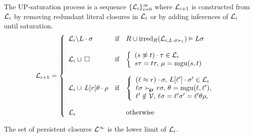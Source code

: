     \begin{definition}[UP-Saturation]

            The UP-{saturation process}
            is a sequence \( \{ \mathcal{L}_i \}_{i=0}^\infty \)
            where $\mathcal{L}_{i+1}$ is constructed from $\mathcal{L}_i$
            by removing redundant literal closures in $\mathcal{L}_i$
            or by adding inferences of $\mathcal{L}_i$ until saturation.
            \begin{gather*}
            \mathcal{L}_{i+1} = \left\{
                    \begin{array}{lclc}
                        \mathcal{L}_i \backslash L\cdot\sigma
                        &\text{if}
                        &R \cup \operatorname{irred}_R(\mathcal{L}_{i,L\cdot\sigma\mathrel\succ_{\mathtt{L}}}) \vDash L\sigma
                        \\
                        \\
                        \mathcal{L}_i \cup\,\square
                        &\text{if}
                        &\left\{\begin{array}{l}
                            (s\not\approx t)\cdot\tau\in\mathcal{L}_i
                            \\
                            s\tau = t\tau,\,
                            \mu=\operatorname{mgu}(s,t)
                        \end{array}\right.
                        \\
                        \\
                        \mathcal{L}_i \cup\, L[r]\theta\cdot\rho
                        &\text{if}
                        &\left\{\begin{array}{l}
                            (\ell\approx r)\cdot\sigma,\,
                            L[\ell']\cdot\sigma'\in\mathcal{L}_i
                            \\
                            \ell\sigma\mathrel\succ_{\!\mathtt{gr}} r\sigma,\,
                            \theta=\operatorname{mgu}(\ell,\ell'),
                            \\
                            \ell'\notin\mathcal{V},\,
                            \ell\sigma = \ell'\sigma' = \ell'\theta\rho,
                        \end{array}\right.
                        \\
                        \\
                        \mathcal{L}_i
                        &&\text{otherwise}
                    \end{array}
                \right.
                \end{gather*}

            The set of persistent closures \( \mathcal{L}^\infty \) is the lower limit of $\mathcal{L}_i$.

    \end{definition}
